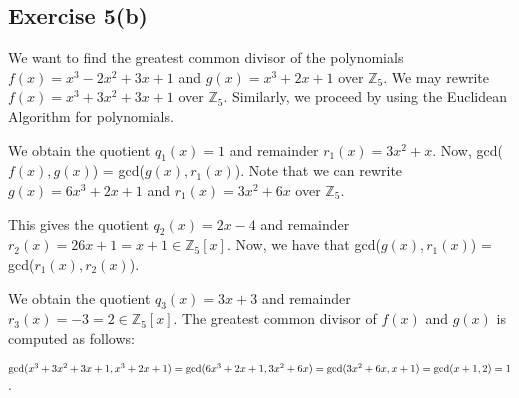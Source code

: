 \subsection*{Exercise 5(b)}
We want to find the greatest common divisor of the polynomials $f(x) = x^3 - 2x^2 + 3x + 1$ and $g(x) = x^3 + 2x + 1$ over $\mathbb{Z}_5$. We may rewrite $f(x) = x^3 + 3x^2 + 3x + 1$ over $\mathbb{Z}_5$. Similarly, we proceed by using the Euclidean Algorithm for polynomials.


We obtain the quotient $q_1(x) = 1$ and remainder $r_1(x) = 3x^2 + x$. Now, gcd($f(x),g(x)$) = gcd($g(x),r_1(x)$). Note that we can rewrite $g(x) = 6x^3 + 2x + 1$ and $r_1(x) = 3x^2 + 6x$ over $\mathbb{Z}_5$.


This gives the quotient $q_2(x) = 2x - 4$ and remainder $r_2(x) = 26x + 1 = x + 1 \in \mathbb{Z}_5[x]$. Now, we have that gcd($g(x),r_1(x)$) = gcd($r_1(x),r_2(x)$).


We obtain the quotient $q_3(x) = 3x + 3$ and remainder $r_3(x) = -3 = 2 \in \mathbb{Z}_5[x]$. The greatest common divisor of $f(x)$ and $g(x)$ is computed as follows:

$\textnormal{gcd}(x^3 + 3x^2 + 3x + 1,x^3 + 2x + 1) = \textnormal{gcd}(6x^3 + 2x + 1,3x^2 + 6x) = \textnormal{gcd}(3x^2 + 6x,x + 1) = \textnormal{gcd}(x + 1,2) = 1$.